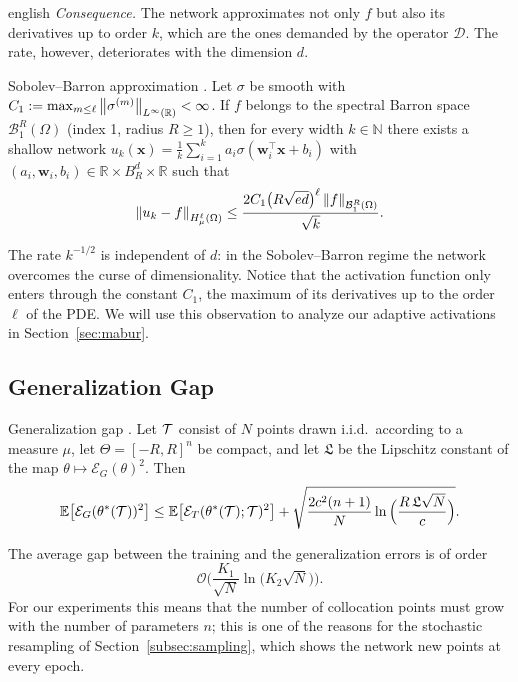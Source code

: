 \begin{hyphenrules}{english}
\emph{Consequence.} The network approximates not only $f$ but also its derivatives up to order $k$, which
are the ones demanded by the operator $\mathcal{D}$. The rate, however, deteriorates with the dimension
$d$.

\begin{teorema}{Sobolev--Barron approximation \cite[Theorem~4.33]{deryck2024acta}.}\label{thm:barron}
Let $\sigma$ be smooth with $C_1:=\max_{m\le\ell}\left\lVert \sigma^{(m)} \right\rVert_{L^\infty(\mathbb{R})}<\infty$. If $f$
belongs to the spectral Barron space $\mathcal{B}^{R}_{1}(\Omega)$ (index 1, radius $R\ge1$), then for
every width $k\in\mathbb{N}$ there exists a shallow network
$u_k(\mathbf{x})=\frac1k\sum_{i=1}^{k}a_i\sigma(\mathbf{w}_i^{\top}\mathbf{x}+b_i)$ with
$(a_i,\mathbf{w}_i,b_i)\in\mathbb{R}\times B^d_R\times\mathbb{R}$ such that
\[
  \left\lVert u_k-f \right\rVert_{H^{\ell}_{\mu}(\Omega)}\le\frac{2C_1\big(R\sqrt{ed}\big)^{\ell}\left\lVert f \right\rVert_{\mathcal{B}^R_1(\Omega)}}{\sqrt{k}}.
\]
\end{teorema}

The rate $k^{-1/2}$ is independent of $d$: in the Sobolev--Barron regime the network overcomes the
curse of dimensionality. Notice that the activation function only enters through the constant $C_1$,
the maximum of its derivatives up to the order $\ell$ of the PDE. We will use this observation to
analyze our adaptive activations in Section~\ref{sec:mabur}.

\subsection{Generalization Gap}

\begin{teorema}{Generalization gap \cite[Theorem~6.2]{deryck2022kolmogorov,beck2022}.}\label{thm:generalization}
Let $\mathcal{T}$ consist of $N$ points drawn i.i.d.\ according to a measure $\mu$, let $\Theta=[-R,R]^{n}$ be
compact, and let $\mathfrak{L}$ be the Lipschitz constant of the map $\theta\mapsto\mathcal{E}_G(\theta)^2$.
Then
\[
  \mathbb{E}\big[\mathcal{E}_G(\theta^{*}(\mathcal{T}))^2\big]\le\mathbb{E}\big[\mathcal{E}_T(\theta^{*}(\mathcal{T});\mathcal{T})^2\big]
  +\sqrt{\frac{2c^2(n+1)}{N}\ln\Big(\frac{R\,\mathfrak{L}\sqrt{N}}{c}\Big)}.
\]
\end{teorema}

The average gap between the training and the generalization errors is of order
\[
  \mathcal{O}\Big(\frac{K_1}{\sqrt N}\ln\big(K_2\sqrt N\big)\Big).
\] For our experiments this means that the number
of collocation points must grow with the number of parameters $n$; this is one of the reasons for the
stochastic resampling of Section~\ref{subsec:sampling}, which shows the network new points at every epoch.


\end{hyphenrules}
